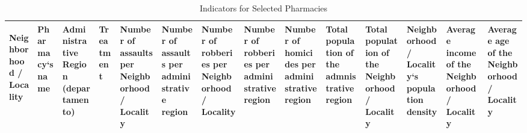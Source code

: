 \documentclass[11pt]{article}
\begin{document}
\newpage
{}
\begin{landscape}
  \tiny
\begin{longtable}[htbp]{@{}p{1.2cm}p{1cm}p{1.5cm}p{1cm}p{1cm}p{1cm}p{1cm}p{1cm}p{1cm}p{1cm}p{1cm}p{1.2cm}p{1cm}p{1cm}@{}}
  \caption{Indicators for Selected  Pharmacies} \\
  \label{tab:phlongtable}
\toprule

Neighborhood / Locality	&	Pharmacy`s name	&	Administrative Region (departamento)	&	Treatment	&	Number of assaults per Neighborhood / Locality	&	Number of assaults per administrative region	&	Number of robberies per Neighborhood / Locality	&	Number of robberies per administrative region	&	Number of homicides per administrative region	&	Total population of the admnistrative region	&	Total population of the Neighborhood / Locality	&	Neighborhood / Locality`s population density	&	Average income of the Neighborhood / Locality	&	Average age of the Neighborhood / Locality	\tabularnewline
\midrule
\endhead


\end{longtable}
\end{landscape}
\end{document}
